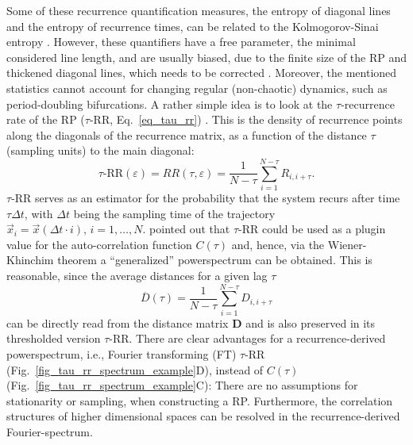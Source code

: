 Some of these recurrence quantification measures, the entropy of diagonal lines and the entropy of 
recurrence times, can be related to the Kolmogorov-Sinai entropy \cite{march2005,baptista2010}. However, these quantifiers have a free parameter, the minimal considered line length, and 
are usually biased, due to the finite size of the RP and thickened diagonal lines, which needs to be corrected \cite{Kraemer2019}. Moreover, the mentioned statistics cannot account for 
changing regular (non-chaotic) dynamics, such as period-doubling bifurcations.
A rather simple idea is to look at the $\tau$-recurrence rate of the RP ($\tau$-RR, Eq.~\ref{eq_tau_rr}) \cite{marwan2002pla,Zbilut2008}.
This is the density of recurrence points along the diagonals of the recurrence matrix, as a function of the distance $\tau$ (sampling units) to the main diagonal:
\begin{equation}\label{eq_tau_rr}
\tau\text{-RR}(\varepsilon) = RR(\tau, \varepsilon) = \frac{1}{N-\tau} \sum_{i=1}^{N-\tau	} R_{i,i+\tau}.
\end{equation}
$\tau$-RR serves as an estimator for the probability that the system recurs after time $\tau \Delta t$, with $\Delta t$ being the sampling time of the trajectory 
$\vec{x}_i = \vec{x}(\Delta t \cdot i),\, i=1,\ldots,N$. 
\citet{Zbilut2008} pointed out that $\tau$-RR could be used as a plugin value for the auto-correlation function $C(\tau)$ and, hence, via the Wiener-Khinchim theorem a 
``generalized'' powerspectrum can be obtained. This is reasonable, since the average distances for a given lag $\tau$ 
\begin{equation}
\overline{D}(\tau) = \frac{1}{N-\tau}\sum_{i=1}^{N-\tau} D_{i, i+\tau}
\end{equation}
can be directly read from the distance matrix $\mathbf{D}$ and is also preserved in its thresholded version $\tau$-RR. There are clear advantages for a recurrence-derived 
powerspectrum, i.e., Fourier transforming (FT) $\tau$-RR (Fig.~\ref{fig_tau_rr_spectrum_example}D), instead 
of $C(\tau)$ (Fig.~\ref{fig_tau_rr_spectrum_example}C): There are no assumptions for stationarity or sampling, when constructing a RP.
Furthermore, the correlation structures of higher dimensional spaces can be resolved in the recurrence-derived Fourier-spectrum.\\

